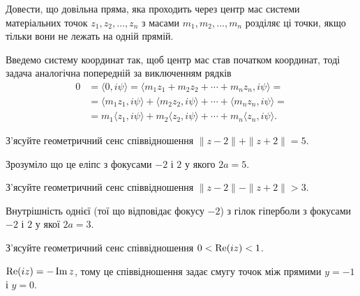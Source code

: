 \begin{problem}[Волковиський, 1.22]
    Довести, що довільна пряма, яка проходить через центр мас системи матеріальних точок $z_1, z_2, \ldots, z_n$ з масами $m_1, m_2, \ldots, m_n$ розділяє ці точки, якщо тільки вони не лежать на одній прямій.
\end{problem}

\begin{solution}
    Введемо систему координат так, щоб центр мас став початком координат, тоді задача аналогічна попередній за виключенням рядків
    \begin{equation*}
    \begin{aligned}
    0 &= \langle 0, i \psi \rangle = \langle m_1 z_1 + m_2 z_2 + \cdots + m_n z_n , i \psi \rangle = \\
    &= \langle m_1 z_1, i\psi \rangle + \langle m_2 z_2, i\psi \rangle + \cdots + \langle m_n z_n , i \psi \rangle = \\
    &= m_1 \langle z_1, i\psi \rangle + m_2 \langle z_2, i\psi \rangle + \cdots + m_n \langle z_n , i \psi \rangle.
    \end{aligned}
    \end{equation*}
\end{solution}

\begin{problem}[Волковиський, 1.24]
    З'ясуйте геометричний сенс співвідношення $\|z - 2\| + \|z + 2\| = 5$.
\end{problem}

\begin{solution}
    Зрозуміло що це еліпс з фокусами $-2$ і $2$ у якого $2a = 5$.
\end{solution}

\begin{problem}[Волковиський, 1.25]
    З'ясуйте геометричний сенс співвідношення $\|z - 2\| - \|z + 2\| > 3$.
\end{problem}

\begin{solution}
    Внутрішність однієї (тої що відповідає фокусу $-2$) з гілок гіперболи з фокусами $-2$ і $2$ у якої $2a = 3$.
\end{solution}

\begin{problem}[Волковиський, 1.28]
    З'ясуйте геометричний сенс співвідношення $0 < \operatorname{Re} (iz) < 1$.
\end{problem}

\begin{solution}
    $\operatorname{Re} (iz) = -\operatorname{Im} z$, тому це співвідношення задає смугу точок між прямими $y = -1$ і $y = 0$. 
\end{solution}


